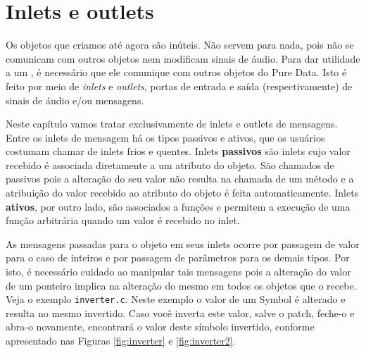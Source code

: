 
\chapter{Inlets e outlets}


Os objetos que criamos até agora são inúteis.
Não servem para nada, pois não se comunicam com outros objetos nem modificam
sinais de áudio.
Para dar utilidade a um \external, é necessário que ele comunique com outros objetos
do Pure Data.
Isto é feito por meio de \emph{inlets} e \emph{outlets}, portas
de entrada e saída (respectivamente) de sinais de áudio e/ou mensagens.

Neste capítulo vamos tratar exclusivamente de inlets e outlets de mensagens.
Entre os inlets de mensagem há os tipos passivos e ativos, que os usuários
costumam chamar de inlets frios e quentes.
Inlets \textbf{passivos} são inlets cujo valor recebido é associada diretamente
a um atributo do objeto.
São chamados de passivos pois a alteração do seu valor não resulta na chamada
de um método e a atribuição do valor recebido ao atributo do objeto é feita
automaticamente.
Inlets \textbf{ativos}, por outro lado, são associados a
funções e permitem a execução de uma função arbitrária quando um valor é
recebido no inlet.

As mensagens passadas para o objeto em seus inlets ocorre por passagem de valor
para o caso de inteiros e por passagem de parâmetros para os demais tipos.
Por isto, é necessário cuidado ao manipular tais mensagens pois a alteração do
valor de um ponteiro implica na alteração do mesmo em todos os objetos que o
recebe.
Veja o exemplo \texttt{inverter.c}.
Neste exemplo o valor de um Symbol é alterado e resulta no mesmo invertido.
Caso você inverta este valor, salve o patch, feche-o e abra-o novamente, encontrará o
valor deste símbolo invertido, conforme apresentado nas Figuras \ref{fig:inverter} e
\ref{fig:inverter2}.


